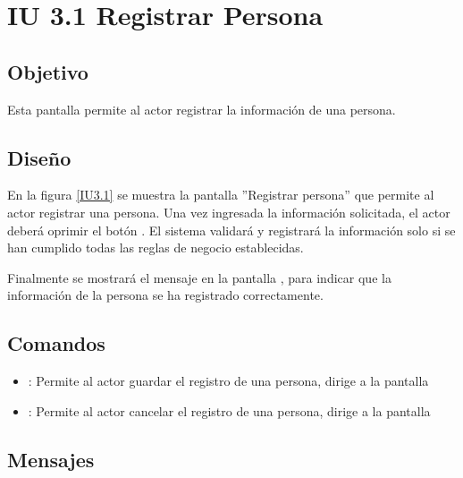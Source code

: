 \section{IU 3.1 Registrar Persona}

\subsection{Objetivo}
	Esta pantalla permite al actor registrar la información de una persona.
\subsection{Diseño}
	En la figura \ref{IU3.1} se muestra la pantalla ''Registrar persona'' que permite al actor registrar una persona.
	Una vez ingresada la información solicitada, el actor deberá oprimir el botón  . El sistema validará y registrará la información solo si se han cumplido todas las reglas de negocio establecidas.
	
	Finalmente se mostrará el mensaje  en la pantalla , para indicar que la información de la persona se ha registrado correctamente.

\label{IU3.1}
\subsection{Comandos}
\begin{itemize}
	\item {}: Permite al actor guardar el registro de una persona, dirige a la pantalla 
	\item {}: Permite al actor cancelar el registro de una persona, dirige a la pantalla 
\end{itemize}

\subsection{Mensajes}

